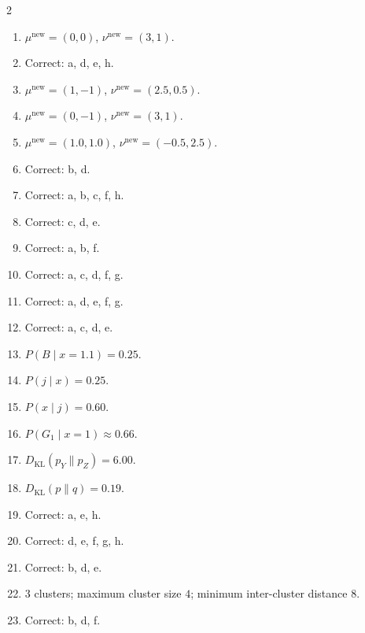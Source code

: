 \documentclass[11pt,oneside]{article}
\begin{document}
\begin{keybox}
\begin{multicols}{2}
\begin{enumerate}[leftmargin=*,label=\textbf{Q\arabic*.}]
  \item $\mu^{\mathrm{new}}=(0,0)$, $\nu^{\mathrm{new}}=(3,1)$.
  \item Correct: a, d, e, h.
  \item $\mu^{\mathrm{new}}=(1,-1)$, $\nu^{\mathrm{new}}=(2.5,0.5)$.
  \item $\mu^{\mathrm{new}}=(0,-1)$, $\nu^{\mathrm{new}}=(3,1)$.
  \item $\mu^{\mathrm{new}}=(1.0,1.0)$, $\nu^{\mathrm{new}}=(-0.5,2.5)$.
  \item Correct: b, d.
  \item Correct: a, b, c, f, h.
  \item Correct: c, d, e.
  \item Correct: a, b, f.
  \item Correct: a, c, d, f, g.
  \item Correct: a, d, e, f, g.
  \item Correct: a, c, d, e.
  \item $P(B\mid x=1.1)=0.25$.
  \item $P(j\mid x)=0.25$.
  \item $P(x\mid j)=0.60$.
  \item $P(G_1\mid x=1)\approx 0.66$.
  \item $D_{\mathrm{KL}}(p_Y\|p_Z)=6.00$.
  \item $D_{\mathrm{KL}}(p\|q)=0.19$.
  \item Correct: a, e, h.
  \item Correct: d, e, f, g, h.
  \item Correct: b, d, e.
  \item $3$ clusters; maximum cluster size $4$; minimum inter-cluster distance $8$.
  \item Correct: b, d, f.
\end{enumerate}
\end{multicols}
\end{keybox}
\end{document}
